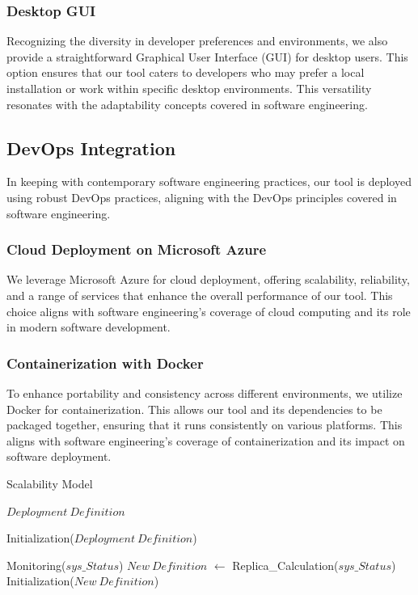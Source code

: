 \documentclass[journal]{IEEEtran}
\begin{document}
\subsubsection{Desktop GUI}

Recognizing the diversity in developer preferences and environments, we also provide a straightforward Graphical User Interface (GUI) for desktop users. This option ensures that our tool caters to developers who may prefer a local installation or work within specific desktop environments. This versatility resonates with the adaptability concepts covered in software engineering.

\subsection{DevOps Integration}
\label{sol:devops}

In keeping with contemporary software engineering practices, our tool is deployed using robust DevOps practices, aligning with the DevOps principles covered in software engineering.

\subsubsection{Cloud Deployment on Microsoft Azure}

We leverage Microsoft Azure for cloud deployment, offering scalability, reliability, and a range of services that enhance the overall performance of our tool. This choice aligns with software engineering's coverage of cloud computing and its role in modern software development.

\subsubsection{Containerization with Docker}

To enhance portability and consistency across different environments, we utilize Docker for containerization. This allows our tool and its dependencies to be packaged together, ensuring that it runs consistently on various platforms. This aligns with software engineering's coverage of containerization and its impact on software deployment.

\begin{algorithm}[hbt!]
    \caption{Scalability Model}\label{alg:Scalabilitymodel}
    \begin{algorithmic}
    
    \Require $Deployment\ Definition$
  
    \State Initialization($Deployment\ Definition$) 

    \Repeat
        \State Monitoring($sys\_Status$)
        \State $New\ Definition$ $\gets$ Replica\_Calculation($sys\_Status$)
        \State Initialization($New\ Definition$) 
    
    \end{algorithmic}
  \end{algorithm}
\end{document}
